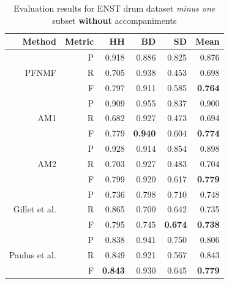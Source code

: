 \documentclass{article}
\begin{document}
\begin{table}[t]
\begin{footnotesize}
\centering
\begin{tabular*}{\textwidth}{@{\extracolsep{\stretch{1}}}*{6}{r}@{}}%
\hline
Method                         & Metric & HH             & BD             & SD             & Mean           \\ \hline
\multirow{3}{*}{PFNMF}         & P      & 0.918          & 0.886          & 0.825          & 0.876          \\
                               & R      & 0.705          & 0.938          & 0.453          & 0.698          \\
                               & F      & 0.797          & 0.911          & 0.585          & \textbf{0.764} \\ \hline
\multirow{3}{*}{AM1}       & P      & 0.909          & 0.955          & 0.837          & 0.900          \\
                               & R      & 0.682          & 0.927          & 0.473          & 0.694          \\
                               & F      & 0.779          & \textbf{0.940} & 0.604          & \textbf{0.774} \\ \hline
\multirow{3}{*}{AM2}       & P      & 0.928          & 0.914          & 0.854          & 0.898          \\
                               & R      & 0.703          & 0.927          & 0.483          & 0.704          \\
                               & F      & 0.799          & 0.920          & 0.617          & \textbf{0.779} \\ \hline
\multirow{3}{*}{Gillet et al.\cite{gillet_transcription_2008}} & P      & 0.736          & 0.798          & 0.710          & 0.748          \\
                               & R      & 0.865          & 0.700          & 0.642          & 0.735          \\
                               & F      & 0.795          & 0.745          & \textbf{0.674} & \textbf{0.738} \\ \hline
\multirow{3}{*}{Paulus et al.\cite{Paulus2009a}} & P      & 0.838          & 0.941          & 0.750          & 0.806          \\
                               & R      & 0.849          & 0.921          & 0.567          & 0.843          \\
                               & F      & \textbf{0.843} & 0.930          & 0.645          & \textbf{0.779} \\ \hline
\end{tabular*}
\end{footnotesize}
\caption{Evaluation results for ENST drum dataset \textit{minus one} subset \textbf{without} accompaniments}\label{results1}
\end{table}
\end{document}
